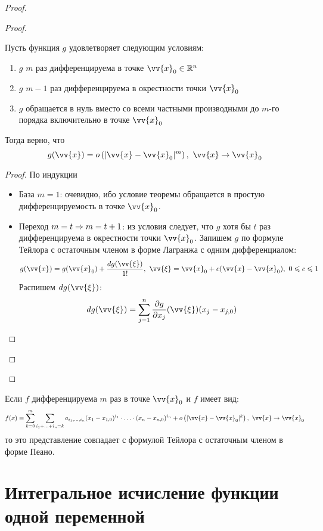 \begin{proof}
\begin{proof}
		\begin{lemma}
			Пусть функция $g$ удовлетворяет следующим условиям:
			\begin{enumerate}
				\item $g$ $m$ раз дифференцируема в точке $\vv{x}_0 \in \R^n$
				
				\item $g$ $m - 1$ раз дифференцируема в окрестности точки $\vv{x}_0$
				
				\item $g$ обращается в нуль вместо со всеми частными производными до $m$-го порядка включительно в точке $\vv{x}_0$
			\end{enumerate}
			Тогда верно, что
			\[
				g(\vv{x}) = o\left(|\vv{x} - \vv{x}_0|^m\right),\ \vv{x} \to \vv{x}_0
			\]
		\end{lemma}
	
		\begin{proof}
			По индукции
			\begin{itemize}
				\item База $m = 1$: очевидно, ибо условие теоремы обращается в простую дифференцируемость в точке $\vv{x}_0$.
				
				\item Переход $m = t \Rightarrow m = t + 1$: из условия следует, что $g$ хотя бы $t$ раз дифференцируема в окрестности точки $\vv{x}_0$. Запишем $g$ по формуле Тейлора с остаточным членом в форме Лагранжа с одним дифференциалом:
				\[
					g(\vv{x}) = g(\vv{x}_0) + \frac{dg(\vv{\xi})}{1!},\ \vv{\xi} = \vv{x}_0 + c(\vv{x} - \vv{x}_0),\ 0 \le c \le 1
				\]
				Распишем $dg(\vv{\xi})$:
				\[
					dg(\vv{\xi}) = \suml_{j = 1}^n \pd{g}{x_j} (\vv{\xi}) (x_j - x_{j, 0})
				\]
			\end{itemize}
		\end{proof}
	\end{proof}
\end{proof}

\begin{note}
	Если $f$ дифференцируема $m$ раз в точке $\vv{x}_0$ и $f$ имеет вид:
	\[
		f(x) = \suml_{k = 0}^m \suml_{i_1 + \ldots + i_n = k} a_{i_1, \ldots, i_n} (x_1 - x_{1, 0})^{i_1} \cdot \ldots \cdot (x_n - x_{n, 0})^{i_n} + o\left(|\vv{x} - \vv{x}_0|^k\right),\ \vv{x} \to \vv{x}_0
	\]
	то это представление совпадает с формулой Тейлора с остаточным членом в форме Пеано.
\end{note}

\section{Интегральное исчисление функции одной переменной}

